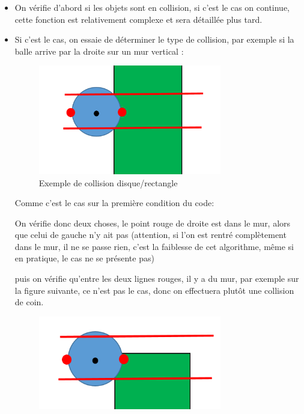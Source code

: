 \documentclass[a4paper,12pt]{report}
\begin{document}
\begin{itemize}

\item On vérifie d'abord si les objets sont en collision, si c'est le cas on continue, cette fonction est relativement complexe et sera détaillée plus tard.

\item Si c'est le cas, on essaie de déterminer le type de collision, par exemple si la balle arrive par la droite sur un mur vertical :

\begin{figure}[H]

\begin{center}

\includegraphics[width=8cm]{pictures/Capture.PNG}

\end{center}

\caption{Exemple de collision disque/rectangle}

\end{figure}

Comme c'est le cas sur la première condition du code:



On vérifie donc deux choses, le point rouge de droite est dans le mur, alors que celui de gauche n'y ait pas (attention, si l'on est rentré complètement dans le mur, il ne se passe rien, c'est la faiblesse de cet algorithme, même si en pratique, le cas ne se présente pas)

puis on vérifie qu'entre les deux lignes rouges, il y a du mur, par exemple sur la figure suivante, ce n'est pas le cas, donc on effectuera plutôt une collision de coin.

\begin{figure}[H]

\begin{center}

\includegraphics[width=8cm]{pictures/Capture2.PNG}


\end{center}
\end{figure}
\end{itemize}
\end{document}

